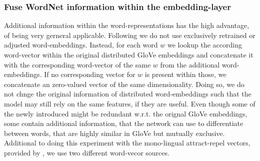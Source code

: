 \subsubsection{Fuse WordNet information within the embedding-layer}
Additional information within the word-representations has the high advantage, of being very gerneral applicable. Following \cite{ruckle2018concatenated} we do not use exclusively retrained or adjusted word-embeddings. Instead, for each word $w$ we lookup the according word-vector within the original distributed GloVe embeddings and concatenate it with the corresponding word-vector of the same $w$ from the additional word-embeddings. If no corresponding vector for $w$ is present within those, we concatenate an zero-valued vector of the same dimensionality. Doing so, we do not chnge the original information of distributed word-embeddings such that the model may still rely on the same features, if they are useful. Even though some of the newly introduced might be redundant w.r.t. the orignal GloVe embeddings, some contain additional information, that the network can use to differentiate between words, that are highly similar in GloVe but mutually exclusive. Additional to doing this experiment with the mono-lingual attract-repel vectors, provided by \cite{ruckle2018concatenated}, we use two different word-vecor sources.

